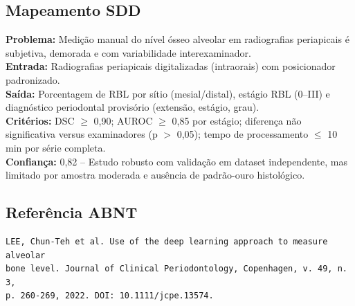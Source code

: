 \subsection{Mapeamento SDD}
\textbf{Problema:} Medição manual do nível ósseo alveolar em radiografias
periapicais é subjetiva, demorada e com variabilidade interexaminador. \\
\textbf{Entrada:} Radiografias periapicais digitalizadas (intraorais) com
posicionador padronizado. \\
\textbf{Saída:} Porcentagem de RBL por sítio (mesial/distal), estágio RBL
(0--III) e diagnóstico periodontal provisório (extensão, estágio, grau). \\
\textbf{Critérios:} DSC $\geq$ 0,90; AUROC $\geq$ 0,85 por estágio; diferença
não significativa versus examinadores (p $>$ 0,05); tempo de processamento
$\leq$ 10 min por série completa. \\
\textbf{Confiança:} 0,82 -- Estudo robusto com validação em dataset independente,
mas limitado por amostra moderada e ausência de padrão-ouro histológico.

\subsection{Referência ABNT}
\begin{verbatim}
LEE, Chun-Teh et al. Use of the deep learning approach to measure alveolar
bone level. Journal of Clinical Periodontology, Copenhagen, v. 49, n. 3,
p. 260-269, 2022. DOI: 10.1111/jcpe.13574.
\end{verbatim}
